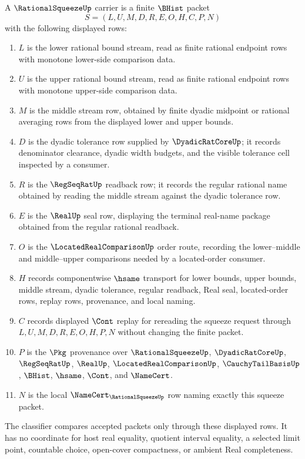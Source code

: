 \begin{definition}
\label{def:rational-squeeze-carrier}
A $\RationalSqueezeUp$ carrier is a finite $\BHist$ packet
$$
S=(L,U,M,D,R,E,O,H,C,P,N)
$$
with the following displayed rows:
\begin{enumerate}
\item $L$ is the lower rational bound stream, read as finite rational endpoint rows with monotone lower-side comparison data.
\item $U$ is the upper rational bound stream, read as finite rational endpoint rows with monotone upper-side comparison data.
\item $M$ is the middle stream row, obtained by finite dyadic midpoint or rational averaging rows from the displayed lower and upper bounds.
\item $D$ is the dyadic tolerance row supplied by $\DyadicRatCoreUp$; it records denominator clearance, dyadic width budgets, and the visible tolerance cell inspected by a consumer.
\item $R$ is the $\RegSeqRatUp$ readback row; it records the regular rational name obtained by reading the middle stream against the dyadic tolerance row.
\item $E$ is the $\RealUp$ seal row, displaying the terminal real-name package obtained from the regular rational readback.
\item $O$ is the $\LocatedRealComparisonUp$ order route, recording the lower--middle and middle--upper comparisons needed by a located-order consumer.
\item $H$ records componentwise $\hsame$ transport for lower bounds, upper bounds, middle stream, dyadic tolerance, regular readback, Real seal, located-order rows, replay rows, provenance, and local naming.
\item $C$ records displayed $\Cont$ replay for rereading the squeeze request through $L,U,M,D,R,E,O,H,P,N$ without changing the finite packet.
\item $P$ is the $\Pkg$ provenance over $\RationalSqueezeUp$, $\DyadicRatCoreUp$, $\RegSeqRatUp$, $\RealUp$, $\LocatedRealComparisonUp$, $\CauchyTailBasisUp$, $\BHist$, $\hsame$, $\Cont$, and $\NameCert$.
\item $N$ is the local $\NameCert_{\RationalSqueezeUp}$ row naming exactly this squeeze packet.
\end{enumerate}
The classifier compares accepted packets only through these displayed rows. It has no coordinate for host real equality, quotient interval equality, a selected limit point, countable choice, open-cover compactness, or ambient Real completeness.
\end{definition}

